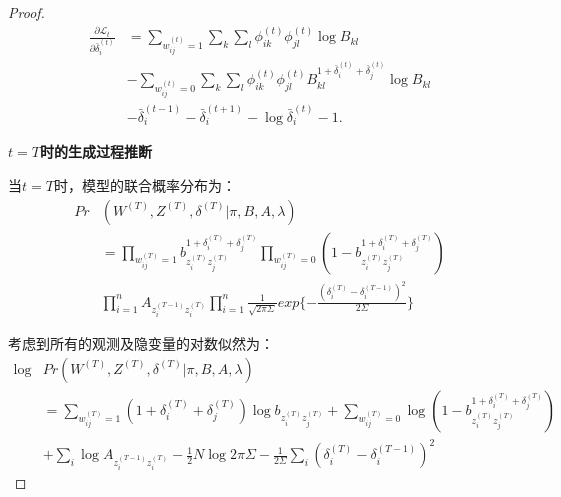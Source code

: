 \begin{proof}
	\begin{align}
		\frac{\partial \mathscr{L}_t}{\partial \bar{\delta}_i^{(t)}} & =\sum_{w_{ij}^{(t)}=1} \sum_k \sum_l \phi_{ik}^{(t)}\phi_{jl}^{(t)} \log B_{kl}  \nonumber\\
		& -\sum_{w_{ij}^{(t)}=0} \sum_k \sum_l \phi_{ik}^{(t)}\phi_{jl}^{(t)}  B_{kl}^{1+\bar{\delta}_i^{(t)}+\bar{\delta}_j^{(t)}} \log B_{kl} \nonumber\\
		& -\bar{\delta}_i^{(t-1)} - \bar{\delta}_i^{(t+1)} - \log \bar{\delta}_i^{(t)} - 1.
		\label{appendix:eq:deltat}
	\end{align}
	
	
	
	
	
	
	\textbf{$t=T$时的生成过程推断}
	
	当$t =T$时，模型的联合概率分布为：
	\begin{equation}
		\begin{split}
			Pr&(W^{(T)},Z^{(T)},\delta^{(T)}|\pi,B,A,\lambda)  \\
			&= \prod_{w_{ij}^{(T)}=1} b_{z_i^{(T)} z_j^{(T)}}^{1+\delta_i^{(T)}+\delta_j^{(T)}}  \prod_{w_{ij}^{(T)}=0} (1-b_{z_i^{(T)} z_j^{(T)}}^{1+\delta_i^{(T)}+\delta_j^{(T)}}) \\
			& \prod_{i=1}^{n} A_{z_i^{(T-1)} z_i^{(T)}}  \prod_{i=1}^{n} \frac{1}{\sqrt{2\pi \Sigma}} exp\{-\frac{(\delta_i^{(T)}-\delta_i^{(T-1)})^2}{2\Sigma}\}
		\end{split}
	\end{equation}
	
	考虑到所有的观测及隐变量的对数似然为：
	\begin{equation}
		\begin{split}
			\log & Pr(W^{(T)},Z^{(T)},\delta^{(T)}|\pi,B,A,\lambda) \\
			&=\sum_{w_{ij}^{(T)}=1} (1+\delta_i^{(T)}+\delta_j^{(T)}) \log b_{z_i^{(T)} z_j^{(T)}} +\sum_{w_{ij}^{(T)}=0} \log (1-b_{z_i^{(T)} z_j^{(T)}}^{1+\delta_i^{(T)}+\delta_j^{(T)}})\\
			& +\sum_{i} \log A_{z_i^{(T-1)} z_i^{(T)}}  -\frac{1}{2}N \log 2 \pi \Sigma -\frac{1}{2\Sigma} \sum_{i} (\delta_i^{(T)}-\delta_i^{(T-1)})^2
		\end{split}
	\end{equation}
	

\end{proof}
